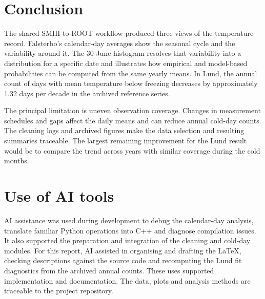 \section{Conclusion}
The shared SMHI-to-ROOT workflow produced three views of the temperature record. Falsterbo's calendar-day averages show the seasonal cycle and the variability around it. The 30 June histogram resolves that variability into a distribution for a specific date and illustrates how empirical and model-based probabilities can be computed from the same yearly means. In Lund, the annual count of days with mean temperature below freezing decreases by approximately 1.32 days per decade in the archived reference series.

The principal limitation is uneven observation coverage. Changes in measurement schedules and gaps affect the daily means and can reduce annual cold-day counts. The cleaning logs and archived figures make the data selection and resulting summaries traceable. The largest remaining improvement for the Lund result would be to compare the trend across years with similar coverage during the cold months.

\section*{Use of AI tools}
AI assistance was used during development to debug the calendar-day analysis, translate familiar Python operations into C++ and diagnose compilation issues. It also supported the preparation and integration of the cleaning and cold-day modules. For this report, AI assisted in organising and drafting the LaTeX, checking descriptions against the source code and recomputing the Lund fit diagnostics from the archived annual counts. These uses supported implementation and documentation. The data, plots and analysis methods are traceable to the project repository.
